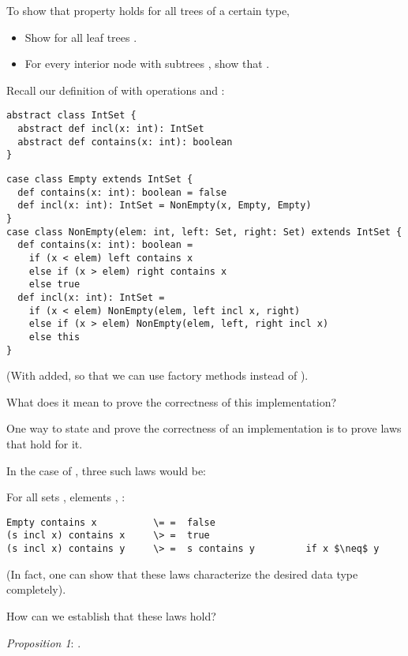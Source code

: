 \documentclass[a4paper,12pt,twoside,titlepage]{book}
\begin{document}
{To show that property  holds for all trees of a certain type,
\begin{itemize}
\item Show  for all leaf trees .
\item For every interior node  with subtrees , 
      show that .
\end{itemize} 

\example Recall our definition of  with 
operations  and :

\begin{lstlisting}
abstract class IntSet {
  abstract def incl(x: int): IntSet
  abstract def contains(x: int): boolean
}
\end{lstlisting}
\es\bs
\begin{lstlisting}
case class Empty extends IntSet {
  def contains(x: int): boolean = false
  def incl(x: int): IntSet = NonEmpty(x, Empty, Empty)
}
case class NonEmpty(elem: int, left: Set, right: Set) extends IntSet {
  def contains(x: int): boolean = 
    if (x < elem) left contains x
    else if (x > elem) right contains x
    else true
  def incl(x: int): IntSet = 
    if (x < elem) NonEmpty(elem, left incl x, right)
    else if (x > elem) NonEmpty(elem, left, right incl x)
    else this
}
\end{lstlisting}
(With  added, so that we can use factory methods instead of ).

What does it mean to prove the correctness of this implementation?
\es
{}

One way to state and prove the correctness of an implementation is
to prove laws that hold for it.

In the case of , three such laws would be:

For all sets , elements , :

\begin{lstlisting}
Empty contains x          \= =  false
(s incl x) contains x     \> =  true
(s incl x) contains y     \> =  s contains y         if x $\neq$ y
\end{lstlisting}

(In fact, one can show that these laws characterize the desired data
type completely).

How can we establish that these laws hold?

\emph{Proposition 1}: .

}
\end{document}
